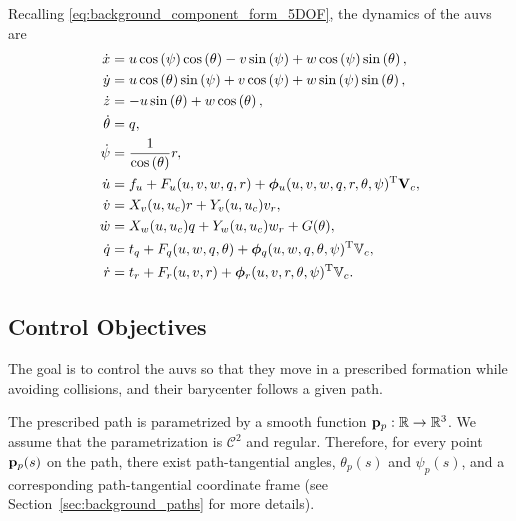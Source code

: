 Recalling \eqref{eq:background_component_form_5DOF}, the dynamics of the \glspl{auv} are
\begin{subequations}
    \begin{align}
        \dot{x} &= u\cos\left(\psi \right)\cos\left(\theta \right)-v\sin\left(\psi \right)+w\cos\left(\psi \right)\sin\left(\theta \right), \\
        \dot{y} &= u\cos\left(\theta \right)\sin\left(\psi \right)+v\cos\left(\psi \right)+w\sin\left(\psi \right)\sin\left(\theta \right), \\
        \dot{z} &= -u\sin\left(\theta \right)+w\cos\left(\theta \right), \\
        \dot{\theta} &= q, \label{eq:nsb_5dof_theta_dot} \\
        \dot{\psi} &= \frac{1}{\cos\left(\theta \right)}r, \label{eq:nsb_5dof_psi_dot} \\
        \dot{u} &= f_{u} + F_u(u, v, w, q, r) + \bm{\phi}_u(u, v, w, q, r, \theta, \psi)^{\mathrm{T}}\mathbf{V}_c, \label{eq:nsb_5dof_u_dot} \\
        \dot{v} &= X_v(u, u_{c})r + Y_v(u, u_{c})v_{r}, \\
        \dot{w} &= X_w(u, u_{c})q + Y_w(u, u_{c})w_{r} + G(\theta), \\
        \dot{q} &= t_{q} + F_q(u, w, q, \theta) + \bm{\phi}_q(u, w, q, \theta, \psi)^{\mathrm{T}}\mathbb{V}_c, \label{eq:nsb_5dof_q_dot} \\
        \dot{r} &= t_{r} + F_r(u, v, r) + \bm{\phi}_r(u, v, r, \theta, \psi)^{\mathrm{T}}\mathbb{V}_c. \label{eq:nsb_5dof_r_dot} 
    \end{align} \label{eq:nsb_5dof_components}
\end{subequations}

\subsection{Control Objectives}
\label{sec:nsb_5dof_objectives}
The goal is to control the \glspl{auv} so that they move in a prescribed formation while avoiding collisions, and their barycenter follows a given path.

The prescribed path is parametrized by a smooth function $\mathbf{p}_p: \mathbb{R} \rightarrow \mathbb{R}^3$.
We assume that the parametrization is $\mathcal{C}^2$ and regular.
Therefore, for every point $\mathbf{p}_p(s)$ on the path, there exist path-tangential angles, $\theta_p(s)$ and $\psi_p(s)$, and a corresponding path-tangential coordinate frame (see Section~\ref{sec:background_paths} for more details).

